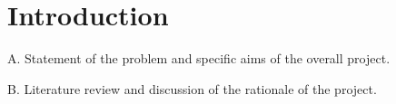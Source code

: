 \setcounter{section}{0}
\section{Introduction}\label{sec:introduction}

A. Statement of the problem and specific aims of the overall project.

B. Literature review and discussion of the rationale of the project.



